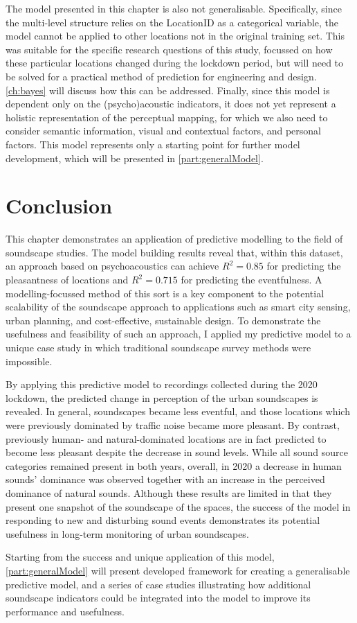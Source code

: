    The model presented in this chapter is also not generalisable. Specifically, since the multi-level structure relies on the LocationID as a categorical variable, the model cannot be applied to other locations not in the original training set. This was suitable for the specific research questions of this study, focussed on how these particular locations changed during the lockdown period, but will need to be solved for a practical method of prediction for engineering and design. \cref{ch:bayes} will discuss how this can be addressed. Finally, since this model is dependent only on the (psycho)acoustic indicators, it does not yet represent a holistic representation of the perceptual mapping, for which we also need to consider semantic information, visual and contextual factors, and personal factors. This model represents only a starting point for further model development, which will be presented in \cref{part:generalModel}.


\section{Conclusion}

 This chapter demonstrates an application of predictive modelling to the field of soundscape studies. The model building results reveal that, within this dataset, an approach based on psychoacoustics can achieve $R^2=0.85$ for predicting the pleasantness of locations and $R^2=0.715$ for predicting the eventfulness. A modelling-focussed method of this sort is a key component to the potential scalability of the soundscape approach to applications such as smart city sensing, urban planning, and cost-effective, sustainable design. To demonstrate the usefulness and feasibility of such an approach, I applied my predictive model to a unique case study in which traditional soundscape survey methods were impossible.

 By applying this predictive model to recordings collected during the 2020 lockdown, the predicted change in perception of the urban soundscapes is revealed. In general, soundscapes became less eventful, and those locations which were previously dominated by traffic noise became more pleasant. By contrast, previously human- and natural-dominated locations are in fact predicted to become less pleasant despite the decrease in sound levels. While all sound source categories remained present in both years, overall, in 2020 a decrease in human sounds' dominance was observed together with an increase in the perceived dominance of natural sounds. Although these results are limited in that they present one snapshot of the soundscape of the spaces, the success of the model in responding to new and disturbing sound events demonstrates its potential usefulness in long-term monitoring of urban soundscapes.

 Starting from the success and unique application of this model, \cref{part:generalModel} will present developed framework for creating a generalisable predictive model, and a series of case studies illustrating how additional soundscape indicators could be integrated into the model to improve its performance and usefulness.

